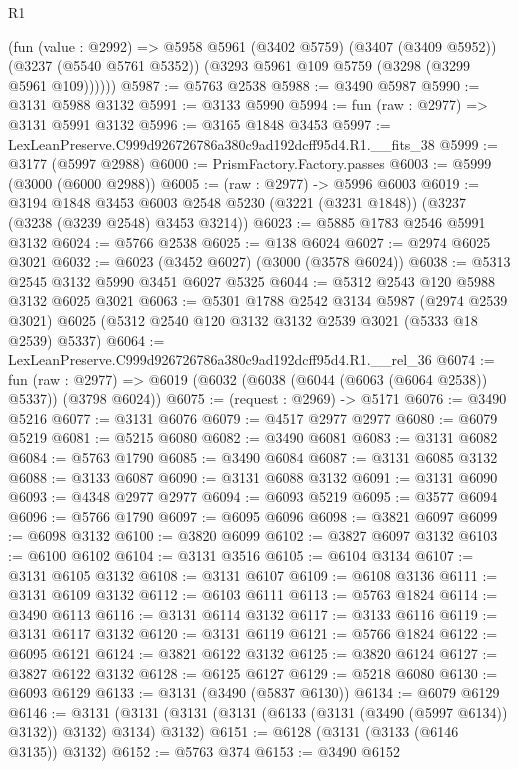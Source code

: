 \begin{lexlean}{R1}
\begin{coremodule}
        (fun (value : @2992) =>
        @5958
          @5961
          (@3402 @5759)
          (@3407 (@3409 @5952))
          (@3237 (@5540 @5761 @5352))
          (@3293 @5961 @109 @5759 (@3298 (@3299 @5961 @109))))))
@5987 := @5763 @2538
@5988 := @3490 @5987
@5990 := @3131 @5988 @3132
@5991 := @3133 @5990
@5994 := fun (raw : @2977) => @3131 @5991 @3132
@5996 := @3165 @1848 @3453
@5997 := LexLeanPreserve.C999d926726786a380c9ad192dcff95d4.R1.__fits_38
@5999 := @3177 (@5997 @2988)
@6000 := PrismFactory.Factory.passes
@6003 := @5999 (@3000 (@6000 @2988))
@6005 := (raw : @2977) -> @5996 @6003
@6019 := @3194
    @1848
    @3453
    @6003
    @2548
    @5230
    (@3221 (@3231 @1848))
    (@3237 (@3238 (@3239 @2548) @3453 @3214))
@6023 := @5885 @1783 @2546 @5991 @3132
@6024 := @5766 @2538
@6025 := @138 @6024
@6027 := @2974 @6025 @3021
@6032 := @6023 (@3452 @6027) (@3000 (@3578 @6024))
@6038 := @5313 @2545 @3132 @5990 @3451 @6027 @5325
@6044 := @5312 @2543 @120 @5988 @3132 @6025 @3021
@6063 := @5301
    @1788
    @2542
    @3134
    @5987
    (@2974 @2539 @3021)
    @6025
    (@5312 @2540 @120 @3132 @3132 @2539 @3021 (@5333 @18 @2539) @5337)
@6064 := LexLeanPreserve.C999d926726786a380c9ad192dcff95d4.R1.__rel_36
@6074 := fun (raw : @2977) =>
  @6019 (@6032 (@6038 (@6044 (@6063 (@6064 @2538)) @5337)) (@3798 @6024))
@6075 := (request : @2969) -> @5171
@6076 := @3490 @5216
@6077 := @3131 @6076
@6079 := @4517 @2977 @2977
@6080 := @6079 @5219
@6081 := @5215 @6080
@6082 := @3490 @6081
@6083 := @3131 @6082
@6084 := @5763 @1790
@6085 := @3490 @6084
@6087 := @3131 @6085 @3132
@6088 := @3133 @6087
@6090 := @3131 @6088 @3132
@6091 := @3131 @6090
@6093 := @4348 @2977 @2977
@6094 := @6093 @5219
@6095 := @3577 @6094
@6096 := @5766 @1790
@6097 := @6095 @6096
@6098 := @3821 @6097
@6099 := @6098 @3132
@6100 := @3820 @6099
@6102 := @3827 @6097 @3132
@6103 := @6100 @6102
@6104 := @3131 @3516
@6105 := @6104 @3134
@6107 := @3131 @6105 @3132
@6108 := @3131 @6107
@6109 := @6108 @3136
@6111 := @3131 @6109 @3132
@6112 := @6103 @6111
@6113 := @5763 @1824
@6114 := @3490 @6113
@6116 := @3131 @6114 @3132
@6117 := @3133 @6116
@6119 := @3131 @6117 @3132
@6120 := @3131 @6119
@6121 := @5766 @1824
@6122 := @6095 @6121
@6124 := @3821 @6122 @3132
@6125 := @3820 @6124
@6127 := @3827 @6122 @3132
@6128 := @6125 @6127
@6129 := @5218 @6080
@6130 := @6093 @6129
@6133 := @3131 (@3490 (@5837 @6130))
@6134 := @6079 @6129
@6146 := @3131 (@3131 (@3131 (@3131 (@6133 (@3131 (@3490 (@5997 @6134)) @3132)) @3132) @3134) @3132)
@6151 := @6128 (@3131 (@3133 (@6146 @3135)) @3132)
@6152 := @5763 @374
@6153 := @3490 @6152

\end{coremodule}
\end{lexlean}

